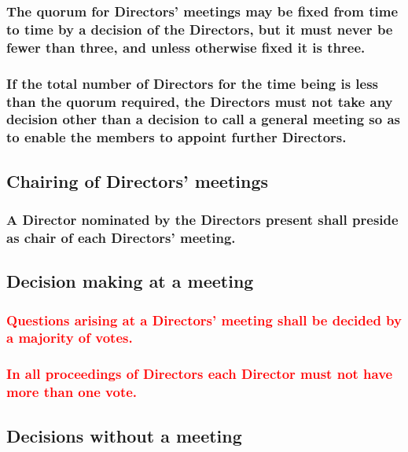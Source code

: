 \documentclass[12pt]{article}
\begin{document}
\subsubsection[Quorum at Directors' meetings may be fixed at any time, or default to at least three]{The quorum for Directors' meetings may be fixed from time to time by a decision of the Directors, but it must never be fewer than three, and unless otherwise fixed it is three.}
\subsubsection[If a Directors' meeting has no quorum, Directors may call a general meeting to appoint further Directors]{If the total number of Directors for the time being is less than the quorum required, the Directors must not take any decision other than a decision to call a general meeting so as to enable the members to appoint further Directors.}

\subsection{Chairing of Directors' meetings}
\subsubsection[Director to chair Directors' meeting]{A Director nominated by the Directors present shall preside as chair of each Directors' meeting.}

\subsection{Decision making at a meeting}
  \subsubsection[Majority voting at a Directors' meeting]{\textcolor{red}{Questions arising at a Directors' meeting shall be decided by a majority of votes.}}
  \subsubsection[A given Director has only one vote at a Director's meeting]{\textcolor{red}{In all proceedings of Directors each Director must not have more than one vote.}}
\subsection{Decisions without a meeting}\label{subsubsection:withoutmeeting}
\end{document}
